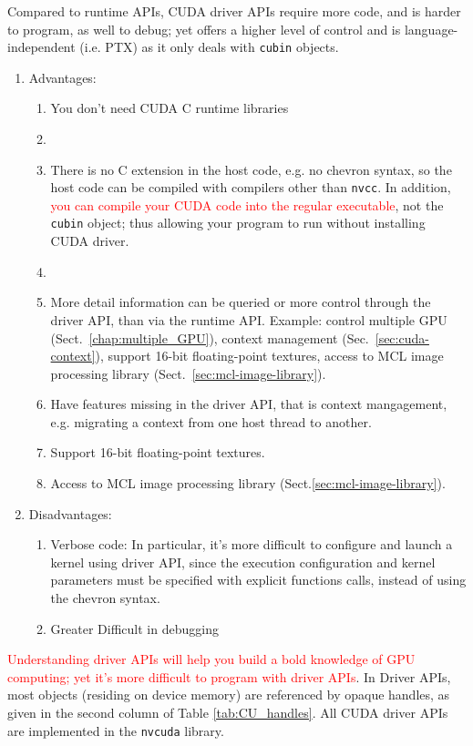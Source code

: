 Compared to runtime APIs, CUDA driver APIs require more code, and is
harder to program, as well to debug; yet offers a higher level of
control and is language-independent (i.e. PTX) as it only deals with
\verb!cubin! objects.
\begin{enumerate}
\item Advantages:
  \begin{enumerate}
  \item You don't need CUDA C runtime libraries
  \item 
  \item There is no C extension in the host code, e.g. no chevron
    syntax, so the host code can be compiled with compilers other than
    \verb!nvcc!. In addition, \textcolor{red}{you can compile your CUDA code
    into the regular executable}, not the \verb!cubin! object; thus allowing
    your program to run without installing CUDA driver. 
    \item 
  \item More detail information can be queried or more control through
    the driver API, than via the runtime API. Example: control
    multiple GPU (Sect.~\ref{chap:multiple_GPU}), context management
    (Sec.~\ref{sec:cuda-context}), support 16-bit floating-point
    textures, access to MCL image processing library
    (Sect.~\ref{sec:mcl-image-library}).    
    
    \item Have features missing in the driver API, that is context
    mangagement, e.g. migrating a context from one host thread to another. 
    \item Support 16-bit floating-point textures.
    \item Access to MCL image processing library
    (Sect.\ref{sec:mcl-image-library}).
  \end{enumerate}

\item Disadvantages: 
  \begin{enumerate}
  \item Verbose code: In particular, it's more difficult to configure
    and launch a kernel using driver API, since the execution
    configuration and kernel parameters must be specified with explicit
    functions calls, instead of using the chevron syntax.
  \item Greater Difficult in debugging
  \end{enumerate}
\end{enumerate}

\textcolor{red}{Understanding driver APIs will help you build a bold
  knowledge of GPU computing; yet it's more difficult to program with
  driver APIs}.
In Driver APIs, most objects (residing on device memory) are
referenced by opaque handles, as given in the second column of Table
\ref{tab:CU_handles}. All CUDA driver APIs are implemented in the
\verb!nvcuda! library.

